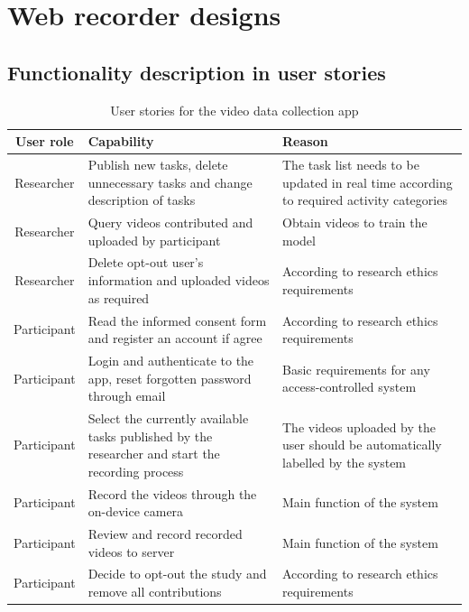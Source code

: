 \chapter{Web recorder designs}
\label{chap:Web recorder designs}
\section{Functionality description in user stories}
\label{sec:Functionality description in user stories}

\begin{table}[!ht]
\renewcommand{\arraystretch}{1.8}
\begin{tabularx}{\textwidth}{|c|X|X|}
\hline
User role   & Capability & Reason \\ \hline
Researcher  & Publish new tasks, delete unnecessary tasks and change description of tasks & The task list needs to be updated in real time according to required activity categories \\ \hline
Researcher  & Query videos contributed and uploaded by participant & Obtain videos to train the model \\ \hline
Researcher  & Delete opt-out user's information and uploaded videos as required & According to research ethics requirements \\ \hline
Participant & Read the informed consent form and register an account if agree & According to research ethics requirements \\ \hline
Participant & Login and authenticate to the app, reset forgotten password through email & Basic requirements for any access-controlled system \\ \hline
Participant & Select the currently available tasks published by the researcher and start the recording process & The videos uploaded by the user should be automatically labelled by the system \\ \hline
Participant & Record the videos through the on-device camera & Main function of the system \\ \hline
Participant & Review and record recorded videos to server & Main function of the system \\ \hline
Participant & Decide to opt-out the study and remove all contributions & According to research ethics requirements \\ \hline
\end{tabularx}
\caption{User stories for the video data collection app}
\label{tab:User stories}
\end{table}

